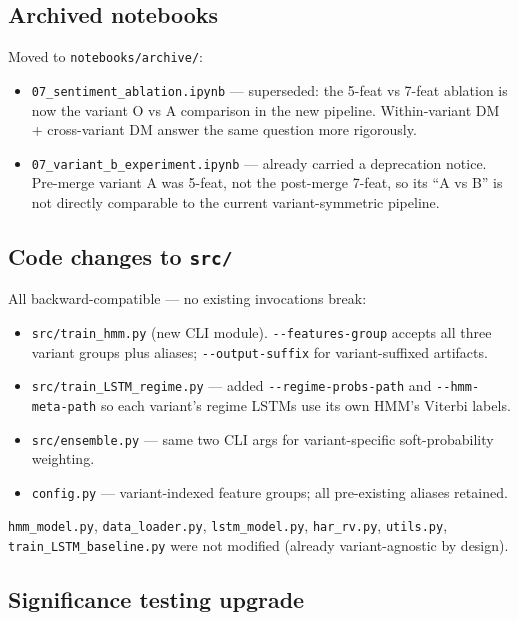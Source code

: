 \documentclass[11pt]{article}
\begin{document}
\subsection*{Archived notebooks}

Moved to \texttt{notebooks/archive/}:

\begin{itemize}[leftmargin=*]
  \item \texttt{07\_sentiment\_ablation.ipynb} --- superseded: the 5-feat vs 7-feat ablation is now the variant O vs A comparison in the new pipeline. Within-variant DM + cross-variant DM answer the same question more rigorously.
  \item \texttt{07\_variant\_b\_experiment.ipynb} --- already carried a deprecation notice. Pre-merge variant A was 5-feat, not the post-merge 7-feat, so its ``A vs B'' is not directly comparable to the current variant-symmetric pipeline.
\end{itemize}

\subsection*{Code changes to \texttt{src/}}

All backward-compatible --- no existing invocations break:

\begin{itemize}[leftmargin=*]
  \item \texttt{src/train\_hmm.py} (new CLI module). \texttt{-{}-features-group} accepts all three variant groups plus aliases; \texttt{-{}-output-suffix} for variant-suffixed artifacts.
  \item \texttt{src/train\_LSTM\_regime.py} --- added \texttt{-{}-regime-probs-path} and \texttt{-{}-hmm-meta-path} so each variant's regime LSTMs use its own HMM's Viterbi labels.
  \item \texttt{src/ensemble.py} --- same two CLI args for variant-specific soft-probability weighting.
  \item \texttt{config.py} --- variant-indexed feature groups; all pre-existing aliases retained.
\end{itemize}

\texttt{hmm\_model.py}, \texttt{data\_loader.py}, \texttt{lstm\_model.py}, \texttt{har\_rv.py}, \texttt{utils.py}, \texttt{train\_LSTM\_baseline.py} were not modified (already variant-agnostic by design).

\subsection*{Significance testing upgrade}
\end{document}
